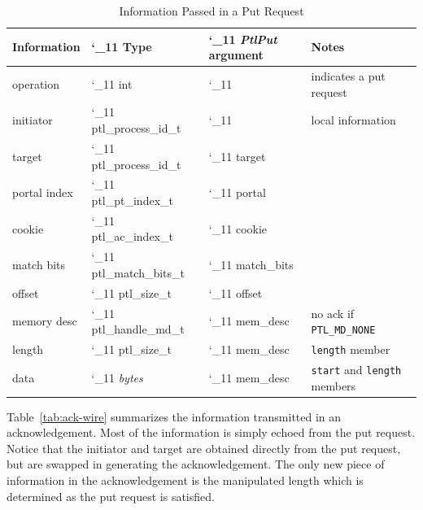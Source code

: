 \documentclass{sand-report}
\def\makeunderletter{\catcode`_11\relax}
\begin{document}
\begin{table}[htbp]
  \begin{center}\small
    \begin{tabular}{l>{\ttfamily\makeunderletter}l>{\ttfamily\makeunderletter}ll}
Information  & \textrm{Type}    & \textrm{\emph{PtlPut} argument}  & Notes \\ \hline
operation    & int              &            & indicates a put request \\
initiator    & ptl_process_id_t &            & local information \\
target       & ptl_process_id_t & target     & \\
portal index & ptl_pt_index_t   & portal     & \\
cookie       & ptl_ac_index_t   & cookie     & \\
match bits   & ptl_match_bits_t & match_bits & \\
offset       & ptl_size_t       & offset     & \\
memory desc  & ptl_handle_md_t  & mem_desc   & no ack if \texttt{PTL_MD_NONE} \\
length       & ptl_size_t       & mem_desc   & \texttt{length} member \\
data         & \textrm{\emph{bytes}} & mem_desc   & \texttt{start} and \texttt{length} members \\
    \end{tabular}
    \caption{Information Passed in a Put Request}
    \label{tab:put-wire}
  \end{center}
\end{table}

Table~\ref{tab:ack-wire} summarizes the information transmitted in an
acknowledgement.  Most of the information is simply echoed from the
put request.  Notice that the initiator and target are obtained
directly from the put request, but are swapped in generating the
acknowledgement.  The only new piece of information in the
acknowledgement is the manipulated length which is determined as the
put request is satisfied.
\end{document}
